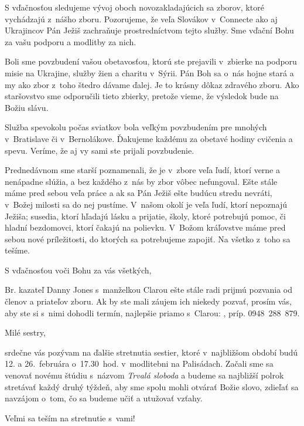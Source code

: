 S vďačnosťou sledujeme vývoj oboch novozakladajúcich sa zborov, ktoré vychádzajú z~nášho zboru. Pozorujeme, že veľa Slovákov v~Connecte ako aj Ukrajincov Pán Ježiš zachraňuje prostredníctvom tejto služby. Sme vďační Bohu za vašu podporu a modlitby za nich.

Boli sme povzbudení vašou obetavosťou, ktorú ste prejavili v~zbierke na podporu misie na Ukrajine, služby žien a charitu v~Sýrii. Pán Boh sa o~nás hojne stará a my ako zbor z~toho štedro dávame ďalej. Je to krásny dôkaz zdravého zboru. Ako staršovstvo sme odporučili tieto zbierky, pretože vieme, že výsledok bude na Božiu slávu.

Služba spevokolu počas sviatkov bola veľkým povzbudením pre mnohých v~Bratislave či v~Bernolákove. Ďakujeme každému za obetavé hodiny cvičenia a spevu. Veríme, že aj vy sami ste prijali povzbudenie.

Prednedávnom sme starší poznamenali, že je v~zbore veľa ľudí, ktorí verne a nenápadne slúžia, a bez každého z~nás by zbor vôbec nefungoval. Ešte stále máme pred sebou veľa práce a ak sa Pán Ježiš ešte budúcu stredu nevráti, v~Božej milosti sa do nej pustíme. V~našom okolí je veľa ľudí, ktorí nepoznajú Ježiša; susedia, ktorí hľadajú lásku a prijatie, školy, ktoré potrebujú pomoc, či hladní bezdomovci, ktorí čakajú na polievku. V~Božom kráľovstve máme pred sebou nové príležitosti, do ktorých sa potrebujeme zapojiť. Na všetko z~toho sa tešíme.

S vďačnosťou voči Bohu za vás všetkých,



Br. kazateľ Danny Jones s~manželkou Clarou ešte stále radi prijmú pozvania od členov a priateľov zboru. Ak by ste mali záujem ich niekedy pozvať, prosím vás, aby ste si s~nimi dohodli termín, najlepšie priamo s~Clarou: , príp. 0948~288~879.


Milé sestry,

srdečne vás pozývam na ďalšie stretnutia sestier, ktoré v~najbližšom období budú 12. a 26.~februára o~17.30~hod. v~modlitebni na Palisádach. Začali sme sa venovať novému štúdiu s~názvom {\it Trvalá sloboda} a budeme sa najbližší polrok stretávať každý druhý týždeň, aby sme spolu mohli otvárať Božie slovo, zdieľať sa navzájom o~tom, čo sa budeme učiť a utužovať vzťahy.

Veľmi sa teším na stretnutie s~vami!

